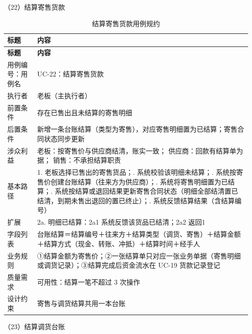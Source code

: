 \noindent（22）结算寄售货款

{\small
\begin{longtable}{@{}L{3.0cm} L{12.3cm}@{}}
\caption{结算寄售货款用例规约}\label{tab:uc-22}\\
\toprule
\textbf{标题} & \textbf{内容} \\
\midrule
\endfirsthead
\toprule
\textbf{标题} & \textbf{内容} \\
\midrule
\endhead
用例编号：用例名 & UC-22：结算寄售货款 \\
\midrule
执行者 & 老板（主执行者） \\
\midrule
前置条件 & 存在已售出且未结算的寄售明细 \\
\midrule
后置条件 & 新增一条台账结算（类型为寄售），对应寄售明细置为已结算；寄售合同状态同步更新 \\
\midrule
涉众利益 & 老板：按寄售价与供应商结清，账实一致；\newline
供应商：回款有结算单为据；\newline
销售：不承担结算职责 \\
\midrule
基本路径 & 1. 老板选择已售出的寄售货品；. 系统校验该明细未结算；. 系统按寄售价创建台账结算（往来方为供应商）；. 系统将寄售明细置为已结算；. 系统按结算或退回结果更新寄售合同状态（明细全部结清置已结清，到期未售出退回的置已终止）；. 系统反馈结算结果（含结算编号） \\
\midrule
扩展 & 2a. 明细已结算：2a1 系统反馈该货品已结清；2a2 返回1 \\
\midrule
字段列表 & 台账结算＝结算编号＋往来方＋结算类型（调货、寄售）＋结算金额＋结算方式（现金、转账、冲抵）＋结算时间＋经手人 \\
\midrule
业务规则 & ①结算金额为寄售价；\newline ②一张结算单只对应一张业务单据（寄售明细或调货记录）；\newline ③结算完成后资金流水在 UC-19 货款记录登记 \\
\midrule
质量需求 & 可用性：结算一笔不超过 3 次操作 \\
\midrule
设计约束 & 寄售与调货结算共用一本台账 \\
\midrule
\bottomrule
\end{longtable}}

\noindent（23）结算调货台账

